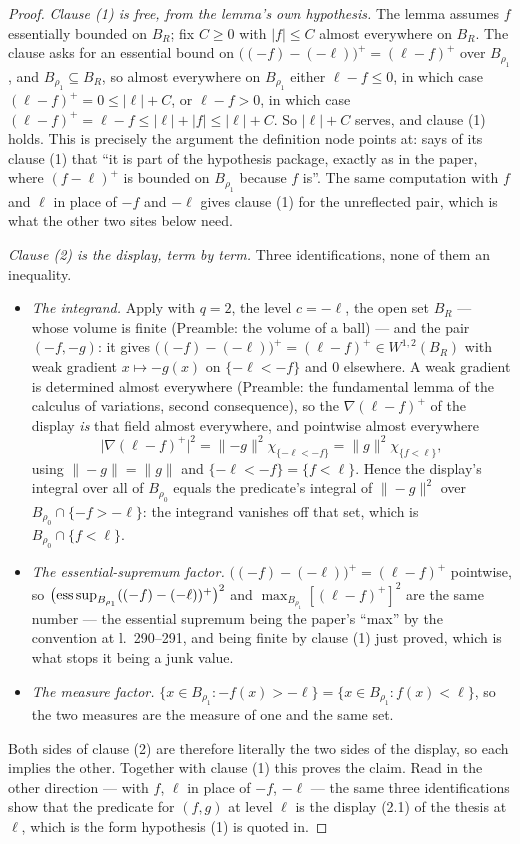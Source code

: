 \begin{proof}
\emph{Clause (1) is free, from the lemma's own hypothesis.}  The lemma assumes
$f$ essentially bounded on $B_R$; fix $C\ge0$ with $|f|\le C$ almost everywhere
on $B_R$.  The clause asks for an essential bound on
$\bigl((-f)-(-\ell)\bigr)^+=(\ell-f)^+$ over $B_{\rho_1}$, and
$B_{\rho_1}\subseteq B_R$, so almost everywhere on $B_{\rho_1}$ either
$\ell-f\le0$, in which case $(\ell-f)^+=0\le|\ell|+C$, or $\ell-f>0$, in which
case $(\ell-f)^+=\ell-f\le|\ell|+|f|\le|\ell|+C$.  So $|\ell|+C$ serves, and
clause (1) holds.  This is precisely the argument the definition node points at:
 says of its clause (1) that ``it is part of the
hypothesis package, exactly as in the paper, where $(f-\ell)^+$ is bounded on
$B_{\rho_1}$ because $f$ is''.  The same computation with $f$ and $\ell$ in place
of $-f$ and $-\ell$ gives clause (1) for the unreflected pair, which is what the
other two sites below need.

\emph{Clause (2) is the display, term by term.}  Three identifications, none of
them an inequality.
\begin{itemize}
\item \emph{The integrand.}  Apply  with
  $q=2$, the level $c=-\ell$, the open set $B_R$ --- whose volume is finite
  (Preamble: the volume of a ball) --- and the pair $(-f,-g)$: it gives
  $\bigl((-f)-(-\ell)\bigr)^+=(\ell-f)^+\in W^{1,2}(B_R)$ with weak gradient
  $x\mapsto-g(x)$ on $\{-\ell<-f\}$ and $0$ elsewhere.  A weak gradient is
  determined almost everywhere (Preamble: the fundamental lemma of the calculus
  of variations, second consequence), so the $\nabla(\ell-f)^+$ of the display
  \emph{is} that field almost everywhere, and pointwise almost everywhere
  \[
  \bigl|\nabla(\ell-f)^+\bigr|^2=\|{-g}\|^2\chi_{\{-\ell<-f\}}
  =\|g\|^2\chi_{\{f<\ell\}} ,
  \]
  using $\|-g\|=\|g\|$ and $\{-\ell<-f\}=\{f<\ell\}$.  Hence the display's
  integral over all of $B_{\rho_0}$ equals the predicate's integral of
  $\|-g\|^2$ over $B_{\rho_0}\cap\{-f>-\ell\}$: the integrand vanishes off that
  set, which is $B_{\rho_0}\cap\{f<\ell\}$.
\item \emph{The essential-supremum factor.}  $\bigl((-f)-(-\ell)\bigr)^+
  =(\ell-f)^+$ pointwise, so
  $\bigl(\operatorname*{ess\,sup}_{B_{\rho_1}}((-f)-(-\ell))^+\bigr)^2$ and
  $\max_{B_{\rho_1}}[(\ell-f)^+]^2$ are the same number --- the essential
  supremum being the paper's ``max'' by the convention at l.~290--291, and being
  finite by clause (1) just proved, which is what stops it being a junk value.
\item \emph{The measure factor.}  $\{x\in B_{\rho_1}:-f(x)>-\ell\}
  =\{x\in B_{\rho_1}:f(x)<\ell\}$, so the two measures are the measure of one
  and the same set.
\end{itemize}
Both sides of clause (2) are therefore literally the two sides of the display, so
each implies the other.  Together with clause (1) this proves the claim.  Read in
the other direction --- with $f$, $\ell$ in place of $-f$, $-\ell$ --- the same
three identifications show that the predicate for $(f,g)$ at level $\ell$ is the
display (2.1) of the thesis at $\ell$, which is the form hypothesis (1) is quoted in.


\end{proof}
